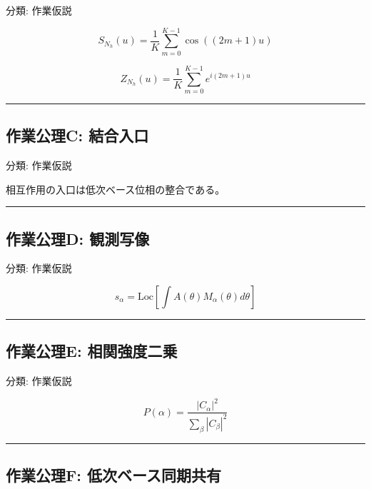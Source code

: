 \documentclass[
  a4paper,
]{ltjsarticle}
\begin{document}
分類: 作業仮説

\[
S_{N_h}(u)=\frac{1}{K}\sum_{m=0}^{K-1}\cos((2m+1)u)
\]

\[
Z_{N_h}(u)=\frac{1}{K}\sum_{m=0}^{K-1}e^{i(2m+1)u}
\]

\begin{center}\rule{0.5\linewidth}{0.5pt}\end{center}

\subsection{作業公理C:
結合入口}\label{ux4f5cux696dux516cux7406c-ux7d50ux5408ux5165ux53e3}

分類: 作業仮説

相互作用の入口は低次ベース位相の整合である。

\begin{center}\rule{0.5\linewidth}{0.5pt}\end{center}

\subsection{作業公理D:
観測写像}\label{ux4f5cux696dux516cux7406d-ux89b3ux6e2cux5199ux50cf}

分類: 作業仮説

\[
s_\alpha=\mathrm{Loc}\left[\int A(\theta)M_\alpha(\theta)d\theta\right]
\]

\begin{center}\rule{0.5\linewidth}{0.5pt}\end{center}

\subsection{作業公理E:
相関強度二乗}\label{ux4f5cux696dux516cux7406e-ux76f8ux95a2ux5f37ux5ea6ux4e8cux4e57}

分類: 作業仮説

\[
P(\alpha)=\frac{|C_\alpha|^2}{\sum_\beta |C_\beta|^2}
\]

\begin{center}\rule{0.5\linewidth}{0.5pt}\end{center}

\subsection{作業公理F:
低次ベース同期共有}\label{ux4f5cux696dux516cux7406f-ux4f4eux6b21ux30d9ux30fcux30b9ux540cux671fux5171ux6709}
\end{document}
